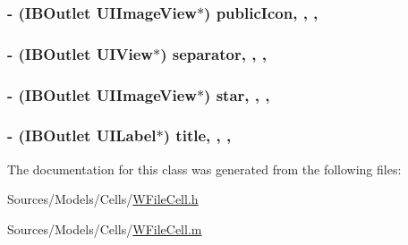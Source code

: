 \hypertarget{interface_w_file_cell_a5eba926c28248e45dd3f0ed980bf05d1}{
\subsubsection[{public\-Icon}]{\setlength{\rightskip}{0pt plus 5cm}-\/ (I\-B\-Outlet U\-I\-Image\-View$\ast$) public\-Icon\hspace{0.3cm}{\ttfamily [read]}, {\ttfamily [write]}, {\ttfamily [nonatomic]}, {\ttfamily [retain]}}}\label{interface_w_file_cell_a5eba926c28248e45dd3f0ed980bf05d1}
\hypertarget{interface_w_file_cell_a759d916b6fd09549a2d37f450b1c4b84}{
\subsubsection[{separator}]{\setlength{\rightskip}{0pt plus 5cm}-\/ (I\-B\-Outlet U\-I\-View$\ast$) separator\hspace{0.3cm}{\ttfamily [read]}, {\ttfamily [write]}, {\ttfamily [nonatomic]}, {\ttfamily [retain]}}}\label{interface_w_file_cell_a759d916b6fd09549a2d37f450b1c4b84}
\hypertarget{interface_w_file_cell_a855adca65a5fcae0cf4d42ca2705a5e9}{
\subsubsection[{star}]{\setlength{\rightskip}{0pt plus 5cm}-\/ (I\-B\-Outlet U\-I\-Image\-View$\ast$) star\hspace{0.3cm}{\ttfamily [read]}, {\ttfamily [write]}, {\ttfamily [nonatomic]}, {\ttfamily [retain]}}}\label{interface_w_file_cell_a855adca65a5fcae0cf4d42ca2705a5e9}
\hypertarget{interface_w_file_cell_ae4e0948d36065919739b6d6d7943456f}{
\subsubsection[{title}]{\setlength{\rightskip}{0pt plus 5cm}-\/ (I\-B\-Outlet U\-I\-Label$\ast$) title\hspace{0.3cm}{\ttfamily [read]}, {\ttfamily [write]}, {\ttfamily [nonatomic]}, {\ttfamily [retain]}}}\label{interface_w_file_cell_ae4e0948d36065919739b6d6d7943456f}


The documentation for this class was generated from the following files\-:\begin{DoxyCompactItemize}
\item 
Sources/\-Models/\-Cells/\hyperlink{_w_file_cell_8h}{W\-File\-Cell.\-h}\item 
Sources/\-Models/\-Cells/\hyperlink{_w_file_cell_8m}{W\-File\-Cell.\-m}\end{DoxyCompactItemize}
